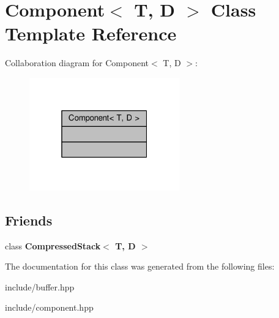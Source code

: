 \hypertarget{class_component}{}\section{Component$<$ T, D $>$ Class Template Reference}
\label{class_component}


Collaboration diagram for Component$<$ T, D $>$\+:
\nopagebreak
\begin{figure}[H]
\begin{center}
\leavevmode
\includegraphics[width=184pt]{class_component__coll__graph}
\end{center}
\end{figure}
\subsection*{Friends}
\begin{DoxyCompactItemize}
\item 
class {\bfseries Compressed\+Stack$<$ T, D $>$}\hypertarget{class_component_a0bc563c952d4b72ba232305ab7717bd9}{}\label{class_component_a0bc563c952d4b72ba232305ab7717bd9}

\end{DoxyCompactItemize}


The documentation for this class was generated from the following files\+:\begin{DoxyCompactItemize}
\item 
include/buffer.\+hpp\item 
include/component.\+hpp\end{DoxyCompactItemize}
